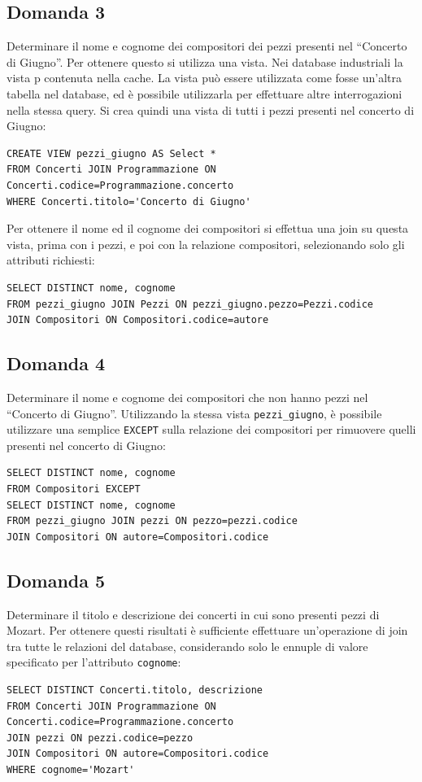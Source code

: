 \documentclass{article}
\numberwithin{equation}{subsection}
\begin{document}
\subsection{Domanda 3}
Determinare il nome e cognome dei compositori dei pezzi presenti nel ``Concerto di Giugno''. Per ottenere questo si utilizza una vista. Nei database industriali 
la vista p contenuta nella cache. La vista può essere utilizzata come fosse un'altra tabella nel database, ed è possibile utilizzarla per effettuare altre 
interrogazioni nella stessa query. Si crea quindi una vista di tutti i pezzi presenti nel concerto di Giugno:
\begin{verbatim}
CREATE VIEW pezzi_giugno AS Select *
FROM Concerti JOIN Programmazione ON Concerti.codice=Programmazione.concerto
WHERE Concerti.titolo='Concerto di Giugno'
\end{verbatim}
Per ottenere il nome ed il cognome dei compositori si effettua una join su questa vista, prima con i pezzi, e poi con la relazione compositori, selezionando solo gli 
attributi richiesti:
\begin{verbatim}
SELECT DISTINCT nome, cognome
FROM pezzi_giugno JOIN Pezzi ON pezzi_giugno.pezzo=Pezzi.codice
JOIN Compositori ON Compositori.codice=autore
\end{verbatim}

\subsection{Domanda 4}
Determinare il nome e cognome dei compositori che non hanno pezzi nel ``Concerto di Giugno''. Utilizzando la stessa vista \verb|pezzi_giugno|, è possibile utilizzare una semplice \verb|EXCEPT| sulla 
relazione dei compositori per rimuovere quelli presenti nel concerto di Giugno:
\begin{verbatim}
SELECT DISTINCT nome, cognome
FROM Compositori EXCEPT
SELECT DISTINCT nome, cognome
FROM pezzi_giugno JOIN pezzi ON pezzo=pezzi.codice 
JOIN Compositori ON autore=Compositori.codice
\end{verbatim}

\subsection{Domanda 5}
Determinare il titolo e descrizione dei concerti in cui sono presenti pezzi di Mozart. Per ottenere questi risultati è sufficiente effettuare un'operazione di join tra tutte le relazioni del database, 
considerando solo le ennuple di valore specificato per l'attributo \verb|cognome|:
\begin{verbatim}
SELECT DISTINCT Concerti.titolo, descrizione 
FROM Concerti JOIN Programmazione ON Concerti.codice=Programmazione.concerto
JOIN pezzi ON pezzi.codice=pezzo
JOIN Compositori ON autore=Compositori.codice
WHERE cognome='Mozart'
\end{verbatim}
\end{document}
